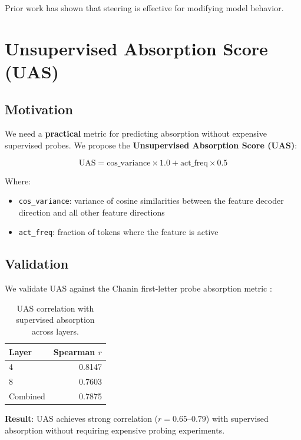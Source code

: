 \documentclass{article}
\begin{document}
Prior work \citep{subramani2022steering, zou2023representation} has shown that steering is effective for modifying model behavior.


\section{Unsupervised Absorption Score (UAS)}

\subsection{Motivation}

We need a \textbf{practical} metric for predicting absorption without expensive supervised probes. We propose the \textbf{Unsupervised Absorption Score (UAS)}:

\begin{equation}
\text{UAS} = \text{cos\_variance} \times 1.0 + \text{act\_freq} \times 0.5
\end{equation}

Where:
\begin{itemize}
    \item \texttt{cos\_variance}: variance of cosine similarities between the feature decoder direction and all other feature directions
    \item \texttt{act\_freq}: fraction of tokens where the feature is active
\end{itemize}

\subsection{Validation}

We validate UAS against the Chanin first-letter probe absorption metric \citep{chanin2024spectral}:

\begin{table}[t]
\caption{UAS correlation with supervised absorption across layers.}
\label{tab:uas-validation}
\centering
\begin{tabular}{lr}
\toprule
Layer & Spearman $r$ \\
\midrule
4 & 0.8147 \\
8 & 0.7603 \\
Combined & 0.7875 \\
\bottomrule
\end{tabular}
\end{table}

\textbf{Result}: UAS achieves strong correlation ($r=0.65\text{--}0.79$) with supervised absorption without requiring expensive probing experiments.
\end{document}
